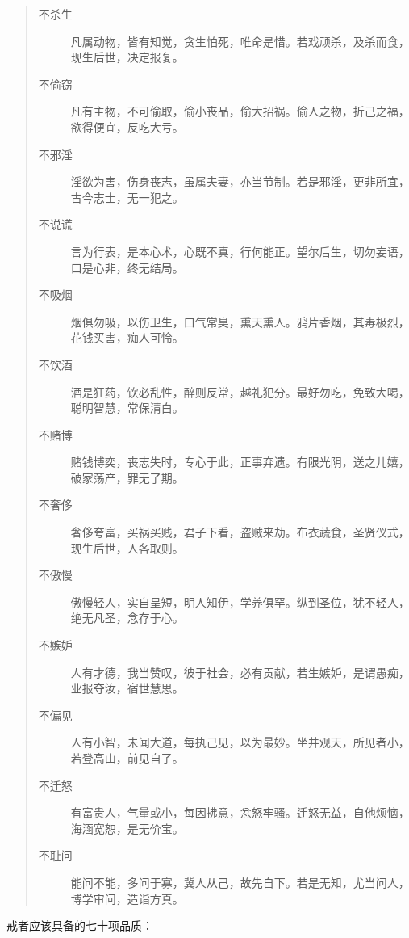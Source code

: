 \begin{quotation}
\begin{adjustwidth}{-1em}{-1em}
\begin{description}
            \item[不杀生] 凡属动物，皆有知觉，贪生怕死，唯命是惜。若戏顽杀，及杀而食，现生后世，决定报复。
            \item[不偷窃] 凡有主物，不可偷取，偷小丧品，偷大招祸。偷人之物，折己之福，欲得便宜，反吃大亏。
            \item[不邪淫] 淫欲为害，伤身丧志，虽属夫妻，亦当节制。若是邪淫，更非所宜，古今志士，无一犯之。
            \item[不说谎] 言为行表，是本心术，心既不真，行何能正。望尔后生，切勿妄语，口是心非，终无结局。
            \item[不吸烟] 烟俱勿吸，以伤卫生，口气常臭，熏天熏人。鸦片香烟，其毒极烈，花钱买害，痴人可怜。
            \item[不饮酒] 酒是狂药，饮必乱性，醉则反常，越礼犯分。最好勿吃，免致大喝，聪明智慧，常保清白。
            \item[不赌博] 赌钱博奕，丧志失时，专心于此，正事弃遗。有限光阴，送之儿嬉，破家荡产，罪无了期。
            \item[不奢侈] 奢侈夸富，买祸买贱，君子下看，盗贼来劫。布衣蔬食，圣贤仪式，现生后世，人各取则。
            \item[不傲慢] 傲慢轻人，实自呈短，明人知伊，学养俱罕。纵到圣位，犹不轻人，绝无凡圣，念存于心。
            \item[不嫉妒] 人有才德，我当赞叹，彼于社会，必有贡献，若生嫉妒，是谓愚痴，业报夺汝，宿世慧思。
            \item[不偏见] 人有小智，未闻大道，每执己见，以为最妙。坐井观天，所见者小，若登高山，前见自了。
            \item[不迁怒] 有富贵人，气量或小，每因拂意，忿怒牢骚。迁怒无益，自他烦恼，海涵宽恕，是无价宝。
            \item[不耻问] 能问不能，多问于寡，冀人从己，故先自下。若是无知，尤当问人，博学审问，造诣方真。
        \end{description}
    \end{adjustwidth}
\end{quotation}

戒者应该具备的七十项品质：

